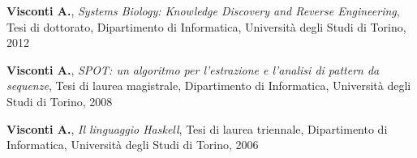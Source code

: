 %
%
%
%
%
%
%


\medskip



	\begin{itemize}
		 \textbf{Visconti A.}, \emph{Systems Biology: Knowledge Discovery and Reverse Engineering}, Tesi di dottorato, Dipartimento di Informatica, Universit\`{a} degli Studi di Torino, 2012 %
	
		 \textbf{Visconti A.}, \emph{SPOT: un algoritmo per l’estrazione e l’analisi di pattern da sequenze}, Tesi di laurea magistrale, Dipartimento di Informatica, Universit\`{a} degli Studi di Torino, 2008

		 \textbf{Visconti A.}, \emph{Il linguaggio Haskell}, Tesi di laurea triennale, Dipartimento di Informatica, Universit\`{a} degli Studi di Torino, 2006
		\end{itemize}
		
